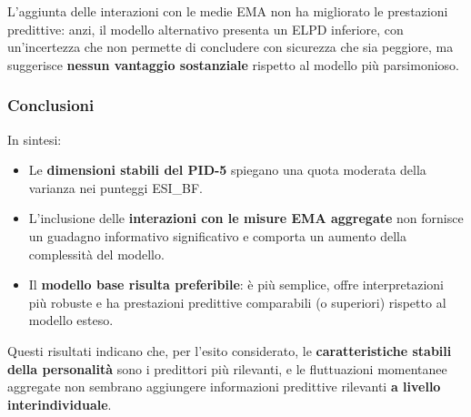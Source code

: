 \documentclass[
  11pt,
  a4paper,
  onecolumn]{article}
\providecommand{\tightlist}{%
  \setlength{\itemsep}{0pt}\setlength{\parskip}{0pt}}
\begin{document}
L'aggiunta delle interazioni con le medie EMA non ha migliorato le
prestazioni predittive: anzi, il modello alternativo presenta un ELPD
inferiore, con un'incertezza che non permette di concludere con
sicurezza che sia peggiore, ma suggerisce \textbf{nessun vantaggio
sostanziale} rispetto al modello più parsimonioso.

\subsubsection{Conclusioni}\label{conclusioni}

In sintesi:

\begin{itemize}
\tightlist
\item
  Le \textbf{dimensioni stabili del PID-5} spiegano una quota moderata
  della varianza nei punteggi ESI\_BF.
\item
  L'inclusione delle \textbf{interazioni con le misure EMA aggregate}
  non fornisce un guadagno informativo significativo e comporta un
  aumento della complessità del modello.
\item
  Il \textbf{modello base risulta preferibile}: è più semplice, offre
  interpretazioni più robuste e ha prestazioni predittive comparabili (o
  superiori) rispetto al modello esteso.
\end{itemize}

Questi risultati indicano che, per l'esito considerato, le
\textbf{caratteristiche stabili della personalità} sono i predittori più
rilevanti, e le fluttuazioni momentanee aggregate non sembrano
aggiungere informazioni predittive rilevanti \textbf{a livello
interindividuale}.
\end{document}
